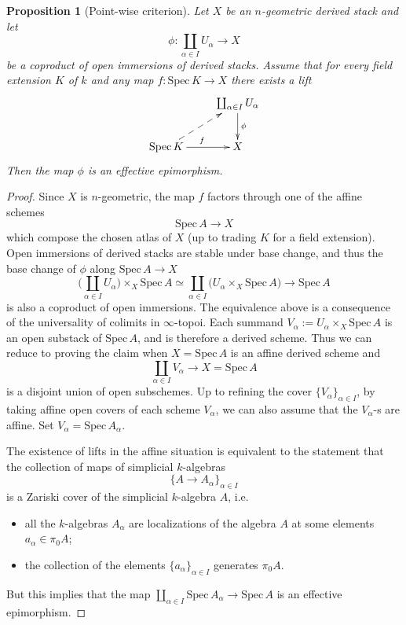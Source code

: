 \documentclass[11pt,letterpaper]{amsart}
\newtheorem{proposition}[dummy]{Proposition}
\newcommand{\Spec}{\mathrm{S}\mathrm{pec}\,}
\begin{document}
\begin{proposition}[Point-wise criterion]\label{proposition:pointwisecriterion2}
Let $X$ be an $n$-geometric derived stack and let 
$$
\phi:\coprod_{\alpha\in I}U_\alpha\rightarrow X
$$ 
be a coproduct of open immersions of derived stacks. Assume that for every field extension $K$ of $k$ and any map $f:\Spec K\rightarrow X$ there exists a lift 
$$
\xymatrix{
& \coprod_{\alpha\in I} U_\alpha \ar[d]^-\phi \\
\Spec K\ar[r]^{f}\ar@{-->}[ur] & X
}
$$
Then the map $\phi$ is an effective epimorphism.
\end{proposition}
\begin{proof} 
Since $X$ is $n$-geometric, the map $f$ factors through one of the affine schemes $$\Spec A\rightarrow X$$ which compose the chosen atlas of $X$ (up to trading $K$ for a field extension). Open immersions of derived stacks are stable under base change, and thus the base change of $\phi$ along $\Spec A\rightarrow X$
$$
\Big ( \coprod_{\alpha\in I} U_\alpha \Big ) \times_X \Spec A \simeq  \coprod_{\alpha\in I} \Big (  U_\alpha  \times_X \Spec A  \Big ) \to \Spec A  
$$
is also a coproduct of open immersions. The equivalence above is a consequence of the universality of colimits in $\infty$-topoi.
Each summand $V_\alpha:=U_\alpha  \times_X \Spec A$ is an open substack of $\Spec A$, and is therefore a derived scheme. 
Thus we can reduce to proving the claim  when $X = \Spec A$  is an affine derived scheme and 
$$
\coprod_{\alpha\in I} V_\alpha \to X = \Spec A
$$
is a disjoint union of open subschemes. Up to refining the cover $\{V_\alpha\}_{\alpha \in I}$, by taking affine open covers of each scheme $V_\alpha$, we can also assume that the $V_\alpha$-s are affine. Set $V_\alpha=\Spec A_\alpha$.

The existence of lifts in the affine situation is equivalent to the statement that the collection of maps of simplicial $k$-algebras $$\{A\rightarrow A_\alpha\}_{\alpha\in I}$$ is a Zariski cover of the simplicial $k$-algebra $A$, i.e.
\begin{itemize}
\item all the  $k$-algebras $A_\alpha$ are localizations of the algebra $A$ at some elements $a_\alpha\in \pi_0 A$;
\item the collection of the elements $\{a_\alpha\}_{\alpha\in I}$ generates $\pi_0 A$.
\end{itemize} 
 
But this implies that the map $\coprod_{\alpha\in I} \Spec A_\alpha\rightarrow\Spec A$ is an effective epimorphism.
\end{proof}
\end{document}
